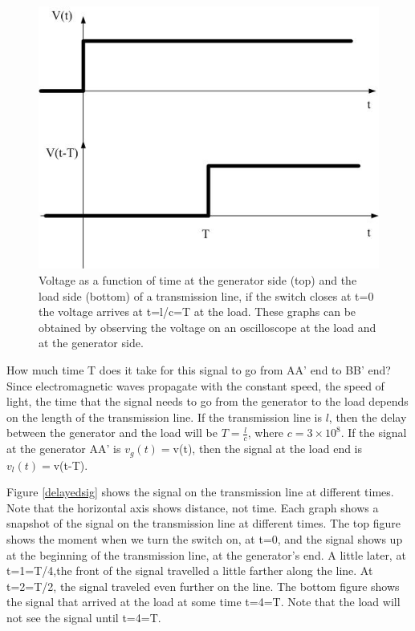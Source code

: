 \documentclass{ximera}
\begin{document}
\begin{figure}[htbp]
\begin{center}
\includegraphics[scale=0.5]{jpg/timedelayedsignal.jpg}  
\end{center}
\caption{Voltage as a function of time at the generator side (top) and the load side (bottom) of a transmission line, if the switch closes at t=0 the voltage arrives at t=l/c=T at the load. These graphs can be obtained by observing the voltage on an oscilloscope at the load and at the generator side.}
\label{timedelaysig} 
 \end{figure}





 How much time T does it take for this signal to go from AA' end to BB' end? 
Since electromagnetic waves propagate with the constant speed, the speed of light, the time that  the signal needs to go from the generator to  the load  depends  on the length of the transmission line. If the transmission line is $l$, then the delay between the generator and the load will be  $T=\frac{l}{c}$, where $c=3\times 10^8$. If the signal at the generator AA' is $v_g(t)=$v(t), then the signal at the load end is $v_l(t)=$v(t-T). 


Figure \ref{delayedsig} shows the signal on the transmission line at different times. Note that the horizontal axis shows distance, not time. Each graph shows a snapshot of the signal on the transmission line at different times. The top figure shows the moment when we turn the switch on, at t=0, and the signal shows up at the beginning of the transmission line, at the generator's end. A little later, at t=1=T/4,the front of the signal travelled a little farther along the line. At t=2=T/2, the signal traveled even further on the line. The bottom figure shows the signal that arrived at the load at some time t=4=T. Note that the load will not see the signal until t=4=T. 
\end{document}
